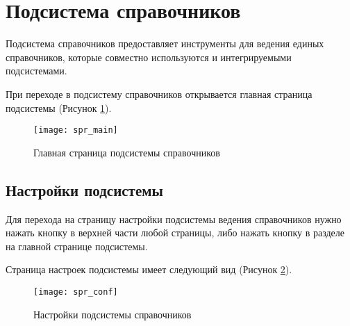 \newpage
\section{Подсистема справочников}

Подсистема справочников предоставляет инструменты для ведения единых справочников, которые совместно используются  \tmis и интегрируемыми подсистемами.

При переходе в подсистему справочников открывается главная страница подсистемы (Рисунок \ref{img_spr_main}).

\begin{figure}[ht]\centering
 \texttt{[image: spr\_main]}
 \caption{Главная страница подсистемы справочников}
 \label{img_spr_main}
\end{figure}

\subsection{Настройки подсистемы}

Для перехода на страницу настройки подсистемы ведения справочников нужно нажать кнопку   в верхней части любой страницы, либо нажать кнопку   в разделе  на главной странице подсистемы.

Страница настроек подсистемы имеет следующий вид (Рисунок \ref{img_spr_conf}).

\begin{figure}[ht]\centering
 \texttt{[image: spr\_conf]}
 \caption{Настройки подсистемы справочников}
 \label{img_spr_conf}
\end{figure}
 
